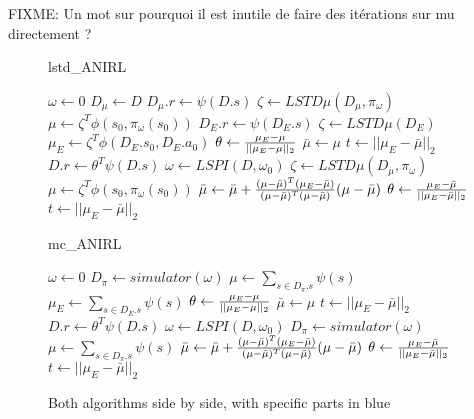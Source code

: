 \documentclass{article}
\begin{document}
FIXME: Un mot sur pourquoi il est inutile de faire des itérations sur mu directement ?
\begin{figure*}
 \begin{minipage}[t]{.45\textwidth}
 \begin{algorithm}[H]
   \caption{lstd\_ANIRL} 
   \label{alg:lstd_anirl} 
   \begin{algorithmic}[1]
     \STATE $\omega \leftarrow 0$
     {\color{blue}
     \STATE $D_\mu \leftarrow D $
     \STATE $D_\mu.r \leftarrow \psi(D.s)$
     \STATE $\zeta \leftarrow LSTD\mu( D_\mu, \pi_\omega )$
     \STATE $\mu \leftarrow \zeta^T\phi(s_0,\pi_\omega(s_0))$
     \STATE $D_E.r \leftarrow \psi(D_E.s)$
     \STATE $\zeta \leftarrow LSTD\mu( D_E )$ 
     \STATE $\mu_E \leftarrow \zeta^T\phi(D_E.s_0, D_E.a_0)$
     }
     \STATE $\theta \leftarrow {\mu_E - \mu\over ||\mu_E - \mu||_2}$
     \STATE $ \bar\mu \leftarrow \mu $
     \STATE $ t \leftarrow ||\mu_E - \bar\mu||_2 $
     \STATE $D.r \leftarrow \theta^T\psi(D.s)$
     \STATE $ \omega \leftarrow LSPI( D, \omega_0 ) $
     {\color{blue}
     \STATE $ \zeta \leftarrow LSTD\mu( D_\mu, \pi_\omega )$   
     \STATE $ \mu \leftarrow \zeta^T\phi(s_0,\pi_\omega(s_0))$}
     \STATE $\bar\mu \leftarrow \bar\mu + { (\mu-\bar\mu)^T (\mu_E-\bar\mu) \over (\mu-\bar\mu)^T (\mu-\bar\mu) } (\mu-\bar\mu) $
     \STATE $\theta \leftarrow 
       {\mu_E - \bar\mu\over ||\mu_E - \bar\mu||_2}$
     \STATE $ t\leftarrow ||\mu_E - \bar\mu||_2$
     \ENDWHILE
   \end{algorithmic}
 \end{algorithm}
 \end{minipage}
 \hfill
 \begin{minipage}[t]{.45\textwidth}
   \begin{algorithm}[H]
   \caption{mc\_ANIRL} 
   \label{alg:mc_anirl} 
   \begin{algorithmic}[1]
     \STATE $\omega \leftarrow 0$
     {\color{blue}
     \STATE $D_\pi \leftarrow simulator( \omega )$
     \STATE $\mu \leftarrow \sum\limits_{s\in D_\pi.s}\psi(s)$
     \STATE $\mu_E \leftarrow \sum\limits_{s\in D_E.s}\psi(s)$
     }
     \STATE $\theta \leftarrow {\mu_E - \mu\over ||\mu_E - \mu||_2}$
     \STATE $ \bar\mu \leftarrow \mu $
     \STATE $ t \leftarrow ||\mu_E - \bar\mu||_2 $
     \STATE $D.r \leftarrow \theta^T\psi(D.s)$
     \STATE $ \omega \leftarrow LSPI( D, \omega_0 ) $
     {\color{blue}
     \STATE $D_\pi \leftarrow simulator( \omega )$
     \STATE $\mu \leftarrow \sum\limits_{s\in D_\pi.s}\psi(s)$
     }
     \STATE $\bar\mu \leftarrow \bar\mu + { (\mu-\bar\mu)^T (\mu_E-\bar\mu) \over (\mu-\bar\mu)^T (\mu-\bar\mu) } (\mu-\bar\mu) $
     \STATE $\theta \leftarrow 
       {\mu_E - \bar\mu\over ||\mu_E - \bar\mu||_2}$
     \STATE $ t\leftarrow ||\mu_E - \bar\mu||_2$
     \ENDWHILE
     \end{algorithmic}  
   \end{algorithm}
 \end{minipage}
 \hfill
 \caption{Both algorithms side by side, with specific parts in blue}
\end{figure*}
\end{document}
